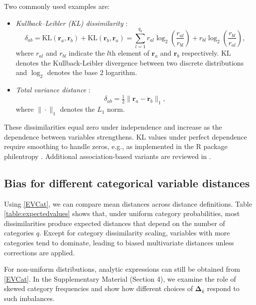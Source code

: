 \documentclass[12pt]{article}
\newcommand{\pkg}[1]{{\normalfont\fontseries{b}\selectfont #1}}
\let\proglang=\textsf
\begin{document}
Two commonly used examples are:
\begin{itemize}
\item \emph{Kullback--Leibler (KL) dissimilarity} \parencite{LH:2005}:
\begin{equation*}
\delta_{ab} = \mathrm{KL}(\mathbf{r}_a,\mathbf{r}_b) + \mathrm{KL}(\mathbf{r}_b,\mathbf{r}_a) = \sum_{l=1}^{q_k} r_{al}\log_2\!(\frac{r_{al}}{r_{bl}}) + r_{bl}\log_2\!(\frac{r_{bl}}{r_{al}}),
\end{equation*}
where $r_{al}$ and $r_{bl}$ indicate the $l$th element of $\mathbf{r}_a$ and $\mathbf{r}_b$ respectively. $\text{KL}$ denotes the Kullback-Leibler divergence between two discrete distributions and $\log_2$ denotes the base $2$ logarithm.
\item \emph{Total variance distance} \parencite{AD:2007}:
\begin{equation*}
\delta_{ab} = \tfrac{1}{2}\|\mathbf{r}_a - \mathbf{r}_b\|_1,
\end{equation*}
where $\|\cdot\|_1$ denotes the $L_1$ norm.
\end{itemize}

These dissimilarities equal zero under independence and increase as the dependence between variables strengthens. KL values under perfect dependence require smoothing to handle zeros, e.g., as implemented in the \proglang{R} package \pkg{philentropy} \parencite{Drost2018}. Additional association-based variants are reviewed in \textcite{vandeveldenetal2024}.

\subsection{Bias for different categorical variable distances}\label{sect:comcatdist}
Using \eqref{EVCat}, we can compare mean distances across distance definitions. Table \ref{table:expectedvalues} shows that, under uniform category probabilities, most dissimilarities produce expected distances that depend on the number of categories $q$. Except for category dissimilarity scaling, variables with more categories tend to dominate, leading to biased multivariate distances unless corrections are applied.

For non-uniform distributions, analytic expressions can still be obtained from \eqref{EVCat}.  In the Supplementary Material (Section 4), we examine the role of skewed category frequencies and show how different choices of $\bm{\Delta}_k$ respond to such imbalances.
\end{document}
